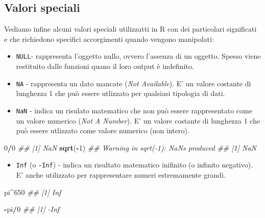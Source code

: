 \documentclass[
]{book}
\newenvironment{Shaded}{\begin{snugshade}}{\end{snugshade}}
\newcommand{\CommentTok}[1]{\textcolor[rgb]{0.56,0.35,0.01}{\textit{#1}}}
\newcommand{\DecValTok}[1]{\textcolor[rgb]{0.00,0.00,0.81}{#1}}
\newcommand{\KeywordTok}[1]{\textcolor[rgb]{0.13,0.29,0.53}{\textbf{#1}}}
\newcommand{\NormalTok}[1]{#1}
\newcommand{\OperatorTok}[1]{\textcolor[rgb]{0.81,0.36,0.00}{\textbf{#1}}}
\providecommand{\tightlist}{%
  \setlength{\itemsep}{0pt}\setlength{\parskip}{0pt}}
\begin{document}
\hypertarget{valori-speciali}{%
\subsection{Valori speciali}\label{valori-speciali}}

Vediamo infine alcuni valori speciali utilizzatti in R con dei particolari significati e che richiedono specifici accorgimenti quando vengono manipolati:

\begin{itemize}
\tightlist
\item
  \texttt{NULL}- rappresenta l'oggetto nullo, ovvero l'assenza di un oggetto. Spesso viene restituito dalle funzioni quano il loro output è indefinito.
\item
  \texttt{NA} - rappresenta un dato mancate (\emph{Not Available}). E' un valore costante di lunghezza 1 che può essere utlizzato per qualsiasi tipologia di dati.
\item
  \texttt{NaN} - indica un risulato matematico che non può essere rappresentato come un valore numerico (\emph{Not A Number}). E' un valore costante di lunghezza 1 che può essere utlizzato come valore numerico (non intero).
\end{itemize}

\begin{Shaded}
\begin{Highlighting}[]
\DecValTok{0}\OperatorTok{/}\DecValTok{0}
\CommentTok{## [1] NaN}
\KeywordTok{sqrt}\NormalTok{(}\OperatorTok{-}\DecValTok{1}\NormalTok{)}
\CommentTok{## Warning in sqrt(-1): NaNs produced}
\CommentTok{## [1] NaN}
\end{Highlighting}
\end{Shaded}

\begin{itemize}
\tightlist
\item
  \texttt{Inf} (o \texttt{-Inf}) - indica un risultato matematico inifinito (o infinito negativo). E' anche utilizzato per rappresentare numeri estremamente grandi.
\end{itemize}

\begin{Shaded}
\begin{Highlighting}[]
\NormalTok{pi}\OperatorTok{^}\DecValTok{650}
\CommentTok{## [1] Inf}

\OperatorTok{-}\NormalTok{pi}\OperatorTok{/}\DecValTok{0}
\CommentTok{## [1] -Inf}
\end{Highlighting}
\end{Shaded}
\end{document}
